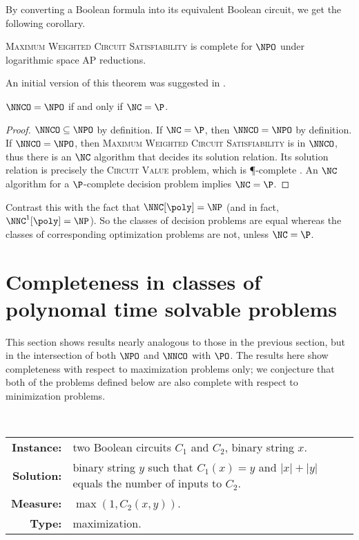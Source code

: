 By converting a Boolean formula into its equivalent Boolean circuit, we get the following corollary.

\begin{corollary}
  \textsc{Maximum Weighted Circuit Satisfiability} is complete for $\NPO$ under logarithmic space AP reductions.
\end{corollary}

An initial version of this theorem was suggested in \autocite{haney13}.

\begin{theorem}\label{thm:nnconpo}
  $\NNCO = \NPO$ if and only if $\NC = \P$.
\end{theorem}
\begin{proof}
  $\NNCO \subseteq \NPO$ by definition.
  If $\NC = \P$, then $\NNCO = \NPO$ by definition.
  If $\NNCO = \NPO$, then \textsc{Maximum Weighted Circuit Satisfiability} is in $\NNCO$, thus there is an $\NC$ algorithm that decides its solution relation.
  Its solution relation is precisely the \textsc{Circuit Value} problem, which is \P-complete \cite[Problem~A.1.1]{ghr95}.
  An $\NC$ algorithm for a $\P$-complete decision problem implies $\NC = \P$.
\end{proof}

Contrast this with the fact that $\NNC[\poly] = \NP$ \autocite[Theorem~2.2]{wolf94} (and in fact, $\NNC^1[\poly] = \NP$).
So the classes of decision problems are equal whereas the classes of corresponding optimization problems are not, unless $\NC = \P$.

\section{Completeness in classes of polynomal time solvable problems}

This section shows results nearly analogous to those in the previous section, but in the intersection of both $\NPO$ and $\NNCO$ with $\PO$.
The results here show completeness with respect to maximization problems only; we conjecture that both of the problems defined below are also complete with respect to minimization problems.

\begin{definition}
  \mbox{} \\
  \begin{tabular}{r p{9.5cm}}
    \textbf{Instance:} & two Boolean circuits $C_1$ and $C_2$, binary string $x$. \\
    \textbf{Solution:} & binary string $y$ such that $C_1(x) = y$ and $|x| + |y|$ equals the number of inputs to $C_2$. \\
    \textbf{Measure:} & $\max(1, C_2(x, y))$. \\
    \textbf{Type:} & maximization.
  \end{tabular}
\end{definition}

